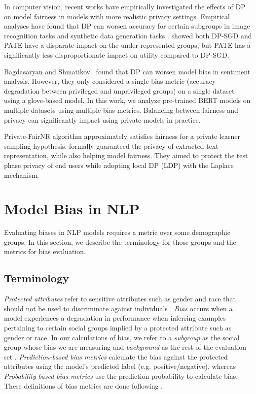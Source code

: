 \documentclass[11pt]{article} %
\begin{document}
In computer vision, recent works have empirically investigated the effects of DP on model fairness in models with more realistic privacy settings. Empirical analyses have found that DP can worsen accuracy for certain subgroups in image recognition tasks \citep{bagdasaryan-fairness, imageanalysisfairness} and synthetic data generation tasks \citep{ganev2021robin}. \cite{uniyal2021dp} showed both DP-SGD and PATE have a disparate impact on the under-represented groups, but PATE has a significantly less disproportionate impact on utility compared to DP-SGD.

Bagdasaryan and Shmatikov~\cite{bagdasaryan-fairness} found that DP can worsen model bias in sentiment analysis. However, they only considered a single bias metric (accuracy degradation between privileged and unprivileged groups) on a single dataset using a glove-based model. In this work, we analyze pre-trained BERT models on multiple datasets using multiple bias metrics. Balancing between fairness and privacy can significantly impact using private models in practice. 

Private-FairNR \citep{cummingsfairness} algorithm approximately satisfies fairness for a private learner sampling hypothesis. \cite{lyu2020differentially} formally guaranteed the privacy of extracted text representation, while also helping model fairness. They aimed to protect the test phase privacy of end users while adopting local DP (LDP) with the Laplace mechanism. 



\section{Model Bias in NLP} \label{section:bias}
Evaluating biases in NLP models requires a metric over some demographic groups. In this section, we describe the terminology for those groups and the metrics for bias evaluation. 
\subsection{Terminology}
\textit{Protected attributes} refer to sensitive attributes such as {gender} and {race} that should not be used to discriminate against individuals \cite{hardt2016equality}. \textit{Bias} occurs when a model experiences a degradation in performance when inferring examples pertaining to certain social groups implied by a protected attribute such as {gender} or {race}. In our calculations of bias, we refer to a \textit{subgroup} as the social group whose bias we are measuring and \textit{background} as the rest of the evaluation set \cite{borkan2019nuanced}. \textit{Prediction-based bias metrics} calculate the bias against the protected attributes using the model's predicted label (e.g. positive/negative), whereas \textit{Probability-based bias metrics} use the prediction probability to calculate bias. These definitions of bias metrics are done following \cite{10.1162/tacl_a_00425}.
\end{document}
